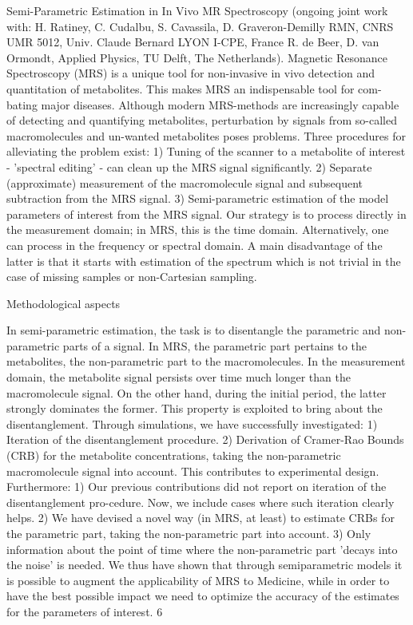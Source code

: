 \documentclass[11pt]{article}
\begin{document}
Semi-Parametric Estimation in In Vivo MR Spectroscopy (ongoing joint work with: H. Ratiney, C. Cudalbu, S. Cavassila, D. Graveron-Demilly RMN, CNRS UMR 5012, Univ. Claude Bernard LYON I-CPE, France R. de Beer, D. van Ormondt, Applied Physics, TU Delft, The Netherlands). Magnetic Resonance Spectroscopy (MRS) is a unique tool for non-invasive in vivo detection and quantitation of metabolites. This makes MRS an indispensable tool for com-bating major diseases. Although modern MRS-methods are increasingly capable of detecting and quantifying metabolites, perturbation by signals from so-called macromolecules and un-wanted metabolites poses problems. Three procedures for alleviating the problem exist: 1) Tuning of the scanner to a metabolite of interest - 'spectral editing' - can clean up the MRS signal significantly. 2) Separate (approximate) measurement of the macromolecule signal and subsequent subtraction from the MRS signal. 3) Semi-parametric estimation of the model parameters of interest from the MRS signal. Our strategy is to process directly in the measurement domain; in MRS, this is the time domain. Alternatively, one can process in the frequency or spectral domain. A main disadvantage of the latter is that it starts with estimation of the spectrum which is not trivial in the case of missing samples or non-Cartesian sampling.

Methodological aspects

In semi-parametric estimation, the task is to disentangle the parametric and non-parametric parts of a signal. In MRS, the parametric part pertains to the metabolites, the non-parametric part to the macromolecules. In the measurement domain, the metabolite signal persists over time much longer than the macromolecule signal. On the other hand, during the initial period, the latter strongly dominates the former. This property is exploited to bring about the disentanglement. Through simulations, we have successfully investigated: 1) Iteration of the disentanglement procedure. 2) Derivation of Cramer-Rao Bounds (CRB) for the metabolite concentrations, taking the non-parametric macromolecule signal into account. This contributes to experimental design. Furthermore: 1) Our previous contributions did not report on iteration of the disentanglement pro-cedure. Now, we include cases where such iteration clearly helps. 2) We have devised a novel way (in MRS, at least) to estimate CRBs for the parametric part, taking the non-parametric part into account. 3) Only information about the point of time where the non-parametric part 'decays into the noise' is needed. We thus have shown that through semiparametric models it is possible to augment the applicability of MRS to Medicine, while in order to have the best possible impact we need to optimize the accuracy of the estimates for the parameters of interest. 6
\end{document}

